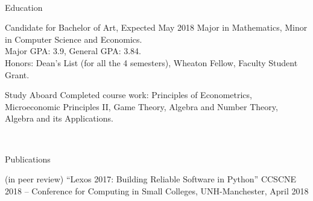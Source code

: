 \documentclass[]{resume-knyte}
\begin{document}



\begin{subheader}{1}
    \\

\end{subheader}

\begin{topic}{Education}


    {Candidate for Bachelor of Art, Expected May 2018}
    {Major in Mathematics, Minor in Computer Science and Economics.\\
     Major GPA: 3.9, General GPA: 3.84.\\
    Honors: Dean's List (for all the 4 semesters), Wheaton Fellow, Faculty Student Grant.}


    {Study Aboard}
    {Completed course work: Principles of Econometrics, Microeconomic Principles II, Game Theory,
     Algebra and Number Theory, Algebra and its Applications.
    }

    \\ %
\end{topic}


\begin{topic}{Publications}


    {(in peer review)}
    {``Lexos 2017: Building Reliable Software in Python''}
    {CCSCNE 2018 – Conference for Computing in Small Colleges, UNH-Manchester, April 2018}

    \\
\end{topic}
\end{document}
